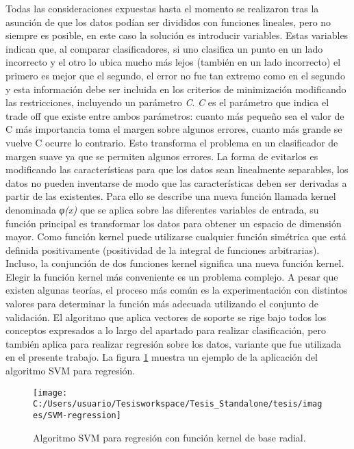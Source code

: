 Todas las consideraciones expuestas hasta el momento se realizaron
tras la asunción de que los datos podían ser divididos con funciones
lineales, pero no siempre es posible, en este caso la solución es
introducir variables. Estas variables indican que, al comparar clasificadores,
si uno clasifica un punto en un lado incorrecto y el otro lo ubica
mucho más lejos (también en un lado incorrecto) el primero es mejor
que el segundo, el error no fue tan extremo como en el segundo y esta
información debe ser incluida en los criterios de minimización modificando
las restricciones, incluyendo un parámetro \emph{C}. \emph{C} es el
parámetro que indica el trade off que existe entre ambos parámetros:
cuanto más pequeño sea el valor de C más importancia toma el margen
sobre algunos errores, cuanto más grande se vuelve C ocurre lo contrario.
Esto transforma el problema en un clasificador de margen suave ya
que se permiten algunos errores. La forma de evitarlos es modificando
las características para que los datos sean linealmente separables,
los datos no pueden inventarse de modo que las características deben
ser derivadas a partir de las existentes. Para ello se describe una
nueva función llamada kernel denominada \emph{φ(x)} que se aplica
sobre las diferentes variables de entrada, su función principal es
transformar los datos para obtener un espacio de dimensión mayor.
Como función kernel puede utilizarse cualquier función simétrica que
está definida positivamente (positividad de la integral de funciones
arbitrarias). Incluso, la conjunción de dos funciones kernel significa
una nueva función kernel. Elegir la función kernel más conveniente
es un problema complejo. A pesar que existen algunas teorías, el proceso
más común es la experimentación con distintos valores para determinar
la función más adecuada utilizando el conjunto de validación. El algoritmo
que aplica vectores de soporte se rige bajo todos los conceptos expresados
a lo largo del apartado para realizar clasificación, pero también
aplica para realizar regresión sobre los datos, variante que fue utilizada
en el presente trabajo. La figura \ref{fig:SVM-regression} muestra
un ejemplo de la aplicación del algoritmo SVM para regresión. 

\begin{figure}
\begin{centering}
\texttt{[image: C:/Users/usuario/Tesisworkspace/Tesis\_Standalone/tesis/images/SVM-regression]}
\par\end{centering}

\caption{Algoritmo SVM para regresión con función kernel de base radial.\label{fig:SVM-regression}}
\end{figure}




